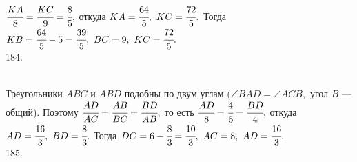 \documentclass[12pt]{article}
\begin{document}
$\cfrac{KA}{8}=\cfrac{KC}{9}=\cfrac{8}{5},$ откуда $KA=\cfrac{64}{5},\ KC=\cfrac{72}{5}.$ Тогда $KB=\cfrac{64}{5}-5=\cfrac{39}{5},\ BC=9,\ KC=\cfrac{72}{5}.$\\
184. \begin{figure}[ht!]
\end{figure}\\
Треугольники $ABC$ и $ABD$ подобны по двум углам $(\angle BAD = \angle ACB,$ угол $B$ --- общий). Поэтому $\cfrac{AD}{AC}=\cfrac{AB}{BC}=\cfrac{BD}{AB},$ то есть
$\cfrac{AD}{8}=\cfrac{4}{6}=\cfrac{BD}{4},$ откуда $AD=\cfrac{16}{3},\ BD=\cfrac{8}{3}.$ Тогда $DC=6-\cfrac{8}{3}=\cfrac{10}{3},\ AC=8,\ AD=\cfrac{16}{3}.$\\
185. \begin{figure}[ht!]
\end{figure}\\
\end{document}
